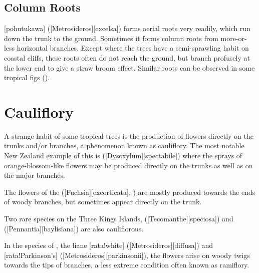 \subsection{Column Roots}

[pohutukawa] ([Metrosideros][excelsa]) forms aerial roots very readily, which run down the trunk to the ground.
Sometimes it forms column roots from more-or-less horizontal branches.
Except where the trees have a semi-sprawling habit on coastal cliffs, these roots often do not reach the ground, but branch profusely at the lower end to give a straw broom effect.
Similar roots can be observed in some tropical figs ().

\section{Cauliflory}

A strange habit of some tropical trees is the production of flowers directly on the trunks and/or branches, a phenomenon known as cauliflory.
The most notable New Zealand example of this is  ([Dysoxylum][spectabile]) where the sprays of orange-blossom-like flowers may be produced directly on the trunks as well as on the major branches.

The flowers of the  ([Fuchsia][excorticata], ) are mostly produced towards the ends of woody branches, but sometimes appear directly on the trunk.

Two rare species on the Three Kings Islands,  ([Tecomanthe][speciosa]) and  ([Pennantia][baylisiana]) are also cauliflorous.

In the species of ,  the liane [rata!white] ([Metrosideros][diffusa]) and [rata!Parkinson's] ([Metrosideros][parkinsonii]), the flowers arise on woody twigs towards the tips of branches, a less extreme condition often known as ramiflory.

